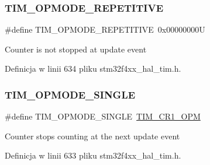 \subsubsection{\texorpdfstring{T\+I\+M\+\_\+\+O\+P\+M\+O\+D\+E\+\_\+\+R\+E\+P\+E\+T\+I\+T\+I\+VE}{TIM\_OPMODE\_REPETITIVE}}
{\footnotesize\ttfamily \#define T\+I\+M\+\_\+\+O\+P\+M\+O\+D\+E\+\_\+\+R\+E\+P\+E\+T\+I\+T\+I\+VE~0x00000000U}

Counter is not stopped at update event 

Definicja w linii 634 pliku stm32f4xx\+\_\+hal\+\_\+tim.\+h.

\mbox{\label{group___t_i_m___one___pulse___mode_gab0447b341024e86145c7ce0dc2931fc6}} 
\subsubsection{\texorpdfstring{T\+I\+M\+\_\+\+O\+P\+M\+O\+D\+E\+\_\+\+S\+I\+N\+G\+LE}{TIM\_OPMODE\_SINGLE}}
{\footnotesize\ttfamily \#define T\+I\+M\+\_\+\+O\+P\+M\+O\+D\+E\+\_\+\+S\+I\+N\+G\+LE~\hyperlink{group___peripheral___registers___bits___definition_ga6d3d1488296350af6d36fbbf71905d29}{T\+I\+M\+\_\+\+C\+R1\+\_\+\+O\+PM}}

Counter stops counting at the next update event 

Definicja w linii 633 pliku stm32f4xx\+\_\+hal\+\_\+tim.\+h.

